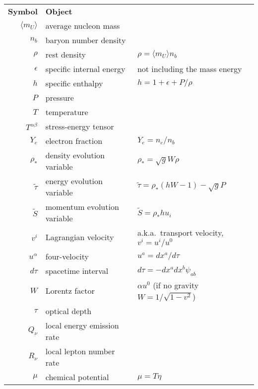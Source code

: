\begin{table}
  \centering
  \begin{tabular}{rll}
    \textbf{Symbol}       & \textbf{Object}           & \\%
    $\langle m_U \rangle$ & average nucleon mass      & \\
    $n_b$                 & baryon number density     & \\
    $\rho$                & rest density              & $\rho=\langle m_U \rangle n_b $ \\
    $\epsilon$            & specific internal energy  & not including the mass energy \\
    $h$                   & specific enthalpy         & $h=1+\epsilon+P/\rho$\\
    $P$                   & pressure                  & \\
    $T$                   & temperature               & \\
    $T^{\alpha \beta}$    & stress-energy tensor      & \\
    $Y_e$                 & electron fraction         & $Y_e=n_e/n_b$\\
    $\rho_*$              & density evolution variable& $\rho_*=\sqrt{g}W\rho$ \\
    $\tilde\tau$          & energy evolution variable & $\tilde\tau=\rho_*(hW-1)-\sqrt{g}P$ \\
    $\tilde S$            & momentum evolution variable & $\tilde S=\rho_*hu_i$\\
    $v^i$                 & Lagrangian velocity       & a.k.a.\ transport velocity, $v^i=u^i/u^0$ \\
    $u^\alpha$            & four-velocity             & $u^a=dx^a/d\tau$ \\
    $d\tau$               & spacetime interval        & $d\tau=-dx^a dx^b \psi_{ab}$ \\
    $W$                   & Lorentz factor            & $\alpha u^0$ (if no gravity $W=1/\sqrt{1-v^2}$) \\
    $\tau$                & optical depth             & \\
    $Q_\nu$               & local energy emission rate& \\
    $R_\nu$               & local lepton number rate  & \\
    $\mu$                 & chemical potential        & $\mu=T\eta$ \\

\end{tabular}
\end{table}
